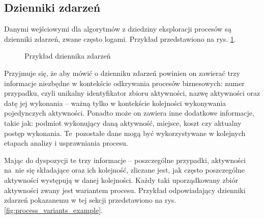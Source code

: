 \subsection{Dzienniki zdarzeń}
\label{sec:event_logs}
Danymi wejściowymi dla algorytmów z dziedziny eksploracji procesów są dzienniki zdarzeń, zwane często logami. Przykład przedstawiono na rys. \ref{fig:event_log_example}.
 
\begin{figure}[h]
	\caption{\label{fig:event_log_example}Przykład dziennika zdarzeń}
\end{figure}

Przyjmuje się, że aby mówić o dzienniku zdarzeń powinien on zawierać trzy informacje niezbędne w kontekście odkrywania procesów biznesowych: numer przypadku, czyli unikalny identyfikator zbioru aktywności, nazwę aktywności oraz datę jej wykonania -- ważną tylko w kontekście kolejności wykonywania pojedynczych aktywności. Ponadto może on zawiera inne dodatkowe informacje, takie jak: podmiot wykonujący daną aktywność, miejsce, koszt czy aktualny postęp wykonania. Te~pozostałe dane mogą być wykorzystywane w kolejnych etapach analizy i usprawniania procesu.

Mając do dyspozycji te trzy informacje -- poszczególne przypadki, aktywności na~nie się składające oraz ich kolejność, zliczane jest, jak często poszczególne aktywności występują w danej kolejności. Każdy taki uporządkowany zbiór aktywności zwany jest wariantem procesu. Przykład odpowiadający dzienniki zdarzeń pokazanemu w tej sekcji przedstawiono na rys. \ref{fig:process_variants_example}.

